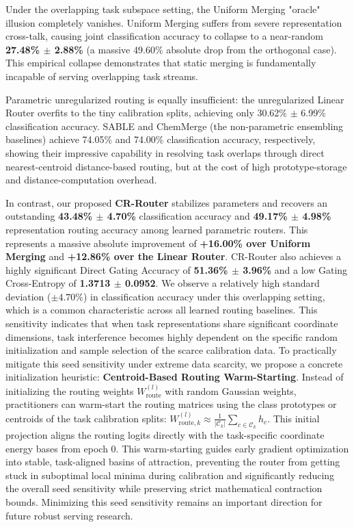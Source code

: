Under the overlapping task subspace setting, the Uniform Merging "oracle" illusion completely vanishes. Uniform Merging suffers from severe representation cross-talk, causing joint classification accuracy to collapse to a near-random \textbf{27.48\% $\pm$ 2.88\%} (a massive 49.60\% absolute drop from the orthogonal case). This empirical collapse demonstrates that static merging is fundamentally incapable of serving overlapping task streams. 

Parametric unregularized routing is equally insufficient: the unregularized Linear Router overfits to the tiny calibration splits, achieving only 30.62\% $\pm$ 6.99\% classification accuracy. SABLE and ChemMerge (the non-parametric ensembling baselines) achieve 74.05\% and 74.00\% classification accuracy, respectively, showing their impressive capability in resolving task overlaps through direct nearest-centroid distance-based routing, but at the cost of high prototype-storage and distance-computation overhead.

In contrast, our proposed \textbf{CR-Router} stabilizes parameters and recovers an outstanding \textbf{43.48\% $\pm$ 4.70\%} classification accuracy and \textbf{49.17\% $\pm$ 4.98\%} representation routing accuracy among learned parametric routers. This represents a massive absolute improvement of \textbf{+16.00\% over Uniform Merging} and \textbf{+12.86\% over the Linear Router}. CR-Router also achieves a highly significant Direct Gating Accuracy of \textbf{51.36\% $\pm$ 3.96\%} and a low Gating Cross-Entropy of \textbf{1.3713 $\pm$ 0.0952}. We observe a relatively high standard deviation ($\pm 4.70\%$) in classification accuracy under this overlapping setting, which is a common characteristic across all learned routing baselines. This sensitivity indicates that when task representations share significant coordinate dimensions, task interference becomes highly dependent on the specific random initialization and sample selection of the scarce calibration data. To practically mitigate this seed sensitivity under extreme data scarcity, we propose a concrete initialization heuristic: \textbf{Centroid-Based Routing Warm-Starting}. Instead of initializing the routing weights $W_{\text{route}}^{(l)}$ with random Gaussian weights, practitioners can warm-start the routing matrices using the class prototypes or centroids of the task calibration splits: $W_{\text{route}, k}^{(l)} \approx \frac{1}{|\mathcal{C}_k|} \sum_{c \in \mathcal{C}_k} h_c$. This initial projection aligns the routing logits directly with the task-specific coordinate energy bases from epoch 0. This warm-starting guides early gradient optimization into stable, task-aligned basins of attraction, preventing the router from getting stuck in suboptimal local minima during calibration and significantly reducing the overall seed sensitivity while preserving strict mathematical contraction bounds. Minimizing this seed sensitivity remains an important direction for future robust serving research.

